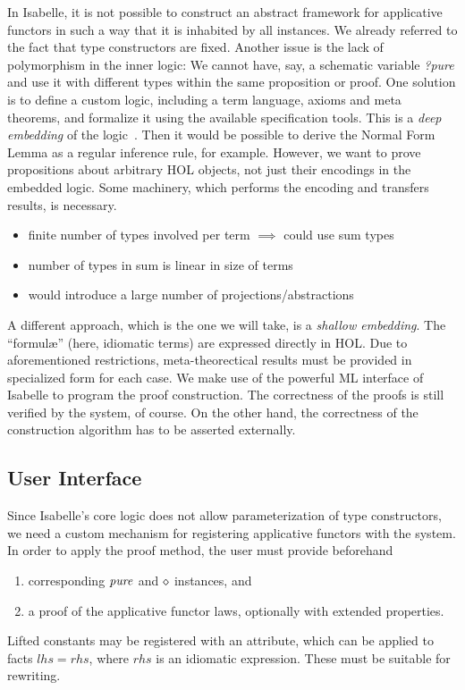In Isabelle, it is not possible to construct an abstract framework for
applicative functors in such a way that it is inhabited by all instances. %
We already referred to the fact that type constructors are fixed.
Another issue is the lack of polymorphism in the inner logic:
We cannot have, say, a schematic variable \textit{?pure} and use it with
different types within the same proposition or proof.
One solution is to define a custom logic, including a term language, axioms
and meta theorems, and formalize it using the available specification tools.
This is a \emph{deep embedding} of the logic~\cite{wildmoser04}.
Then it would be possible to derive the Normal Form Lemma as a regular
inference rule, for example. %
However, we want to prove propositions about arbitrary HOL objects, not just
their encodings in the embedded logic.
Some machinery, which performs the encoding and transfers results, is necessary.
\begin{itemize}
\item finite number of types involved per term $\implies$ could use sum types
\item number of types in sum is linear in size of terms
\item would introduce a large number of projections/abstractions
\end{itemize}
\todo

A different approach, which is the one we will take, is a \emph{shallow embedding}.
The ``formul\ae'' (here, idiomatic terms) are expressed directly in HOL.
Due to aforementioned restrictions, meta-theorectical results must be provided
in specialized form for each case.
We make use of the powerful ML interface of Isabelle to program the proof
construction.
The correctness of the proofs is still verified by the system, of course.
On the other hand, the correctness of the construction algorithm has to be
asserted externally.



\subsection{User Interface}\label{subsec:interface}

Since Isabelle's core logic does not allow parameterization of type constructors,
we need a custom mechanism for registering applicative functors with the
system.
In order to apply the proof method, the user must provide beforehand
\begin{enumerate}
	\item corresponding $\operatorname{\mathit{pure}}$ and $\diamond$ instances, and
	\item a proof of the applicative functor laws, optionally with extended
	properties.
\end{enumerate}
Lifted constants may be registered with an attribute, which can be applied to
facts $\mathit{lhs} = \mathit{rhs}$, where $\mathit{rhs}$ is an idiomatic
expression.
These must be suitable for rewriting.

